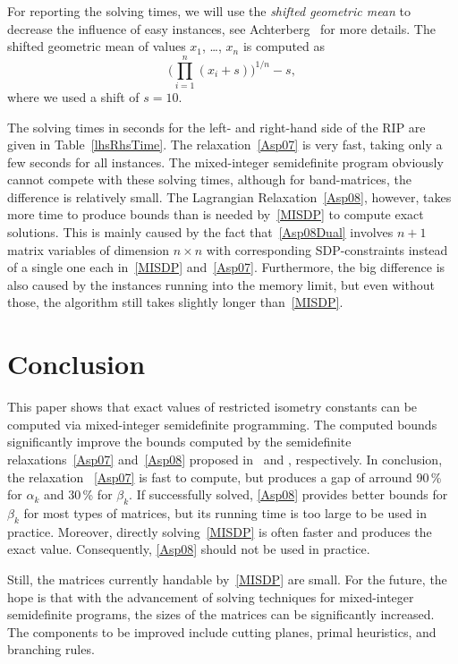 \documentclass[journal]{IEEEtran}
\begin{document}
For reporting the solving times, we will use the \emph{shifted
  geometric mean} to decrease the influence of easy instances, see
Achterberg~\cite{SCIP} for more details. The shifted geometric
mean of values $x_1$, \dots, $x_n$ is computed as
\begin{equation*}
  \Big( \prod_{i=1}^n (x_i + s)\Big)^{1/n} - s,
\end{equation*}
where we used a shift of $s=10$.

The solving times in seconds for the left- and right-hand side of the RIP are given in
Table~\ref{lhsRhsTime}. The relaxation~\eqref{Asp07}
is very fast, taking only a few seconds for all instances. The mixed-integer semidefinite program obviously
cannot compete with these solving times, although for band-matrices, the difference is relatively
small. The Lagrangian Relaxation~\eqref{Asp08}, however, takes more time to produce bounds than is needed
by~\eqref{MISDP} to compute exact solutions. This is mainly caused by the fact that~\eqref{Asp08Dual} involves
$n+1$ matrix variables of dimension $n\times n$ with corresponding SDP-constraints instead of a 
single one each in~\eqref{MISDP} and~\eqref{Asp07}.
Furthermore, the big difference is also caused by the instances running into the 
memory limit, but even without those, the algorithm still takes slightly longer than~\eqref{MISDP}.



\section{Conclusion}

\noindent
This paper shows that exact values of restricted isometry constants can be
computed via mixed-integer semidefinite programming. The computed bounds
significantly improve the bounds computed by the semidefinite
relaxations~\eqref{Asp07} and~\eqref{Asp08}
proposed in~\cite{Asp07} and \cite{Asp08}, respectively. In conclusion, the relaxation~
\eqref{Asp07} is fast to compute, but produces a gap of arround 90\,\% for
$\alpha_k$ and 30\,\% for $\beta_k$. If successfully solved, 
\eqref{Asp08} provides better bounds for $\beta_k$ for most types of 
matrices, but its running time is too large
to be used in practice. Moreover, directly solving~\eqref{MISDP} is often
faster and produces the exact value. Consequently, 
\eqref{Asp08} should not be used in practice.

Still, the matrices currently handable by~\eqref{MISDP} are small. For the
future, the hope is that with the advancement of solving techniques for
mixed-integer semidefinite programs, the sizes of the matrices can be
significantly increased. The components to be improved include cutting
planes, primal heuristics, and branching rules.



\end{document}
